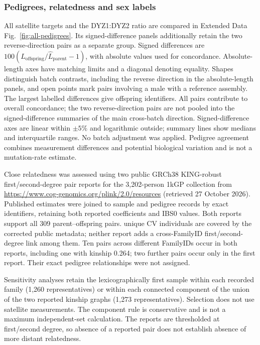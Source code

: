 \subsubsection{Pedigrees, relatedness and sex labels}
All  satellite targets and the DYZ1:DYZ2 ratio are compared in Extended Data Fig.~\ref{fig:all-pedigrees}. Its signed-difference panels additionally retain the two reverse-direction pairs as a separate group. Signed differences are $100(\widehat L_{\mathrm{offspring}}/\widehat L_{\mathrm{parent}}-1)$, with absolute values used for concordance. Absolute-length axes have matching limits and a diagonal denoting equality. Shapes distinguish batch contrasts, including the reverse direction in the absolute-length panels, and open points mark pairs involving a male with a reference assembly. The largest labelled differences give offspring identifiers. All pairs contribute to overall concordance; the two reverse-direction pairs are not pooled into the signed-difference summaries of the main cross-batch direction. Signed-difference axes are linear within $\pm5\%$ and logarithmic outside; summary lines show medians and interquartile ranges. No batch adjustment was applied. Pedigree agreement combines measurement differences and potential biological variation and is not a mutation-rate estimate.

Close relatedness was assessed using two public GRCh38 KING-robust first/second-degree pair reports for the 3,202-person 1kGP collection from \url{https://www.cog-genomics.org/plink/2.0/resources} (retrieved 27 October 2026). Published estimates were joined to sample and pedigree records by exact identifiers, retaining both reported coefficients and IBS0 values. Both reports support all 309 parent--offspring pairs.  unique CV individuals are covered by the corrected public metadata; neither report adds a cross-FamilyID first/second-degree link among them. Ten pairs across different FamilyIDs occur in both reports, including one with kinship 0.264; two further pairs occur only in the first report. Their exact pedigree relationships were not assigned.

Sensitivity analyses retain the lexicographically first sample within each recorded family (1,260 representatives) or within each connected component of the union of the two reported kinship graphs (1,273 representatives). Selection does not use satellite measurements. The component rule is conservative and is not a maximum independent-set calculation. The reports are thresholded at first/second degree, so absence of a reported pair does not establish absence of more distant relatedness.

